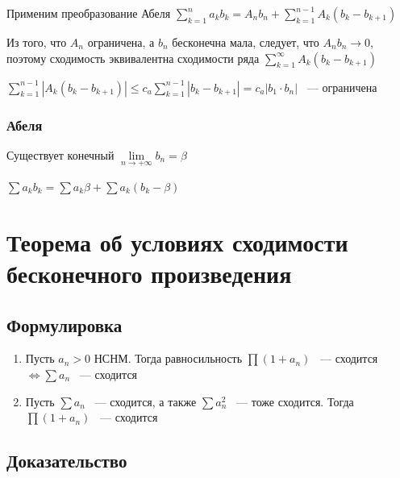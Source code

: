 \documentclass{article}
\begin{document}
                Применим преобразование Абеля $\sum\limits^n_{k = 1} a_k b_k = A_n b_n + \sum\limits^{n - 1}_{k = 1} A_k (b_k - b_{k + 1})$
                
                Из того, что $A_n$ ограничена, а $b_n$ бесконечна мала, следует, что $A_n b_n \rightarrow 0$, поэтому сходимость эквивалентна сходимости ряда $\sum\limits^{\infty}_{k = 1} A_k (b_k - b_{k + 1})$
                
                $\sum\limits^{n - 1}_{k = 1} \left| A_k (b_k - b_{k + 1}) \right| \leq c_a \sum\limits^{n - 1}_{k = 1} \left| b_k - b_{k + 1} \right| = c_a |b_1 \cdot b_n|$ ~--- ограничена
                
            \subsubsection{Абеля}
            
                Существует конечный $\lim\limits_{n \rightarrow +\infty} b_n = \beta$
                
                $\sum a_k b_k = \sum a_k \beta + \sum a_k (b_k - \beta)$
                
    \newpage
    
    \section{Теорема об условиях сходимости бесконечного произведения}
    
        \subsection{Формулировка}
        
            \begin{enumerate}
            
                \item Пусть $a_n > 0$ НСНМ. Тогда равносильность $\prod\limits (1 + a_n)$ ~--- сходится $\Leftrightarrow \sum a_n$ ~--- сходится
                
                \item Пусть $\sum a_n$ ~--- сходится, а также $\sum a^2_n$ ~--- тоже сходится. Тогда $\prod (1 + a_n)$ ~--- сходится
                
            \end{enumerate}
        
        \subsection{Доказательство}
        
\end{document}
